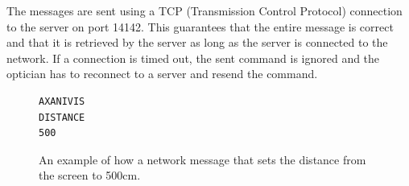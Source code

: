 \documentclass[12pt,a4paper,notitlepage]{report}
\begin{document}
The messages are sent using a TCP (Transmission Control Protocol) connection to the server on port 14142. This guarantees that the entire message is correct and that it is retrieved by the server as long as the server is connected to the network. If a connection is timed out, the sent command is ignored and the optician has to reconnect to a server and resend the command.



\begin{figure}[h]
  \lstset{%
    basicstyle=\ttfamily\bfseries,
    xleftmargin=.4\textwidth, xrightmargin=.2\textwidth
  }
\begin{lstlisting}
AXANIVIS
DISTANCE
500
\end{lstlisting}
\caption{An example of how a network message that sets the distance from the screen to 500cm.
\label{fig:example_message}}
\end{figure}
\end{document}
